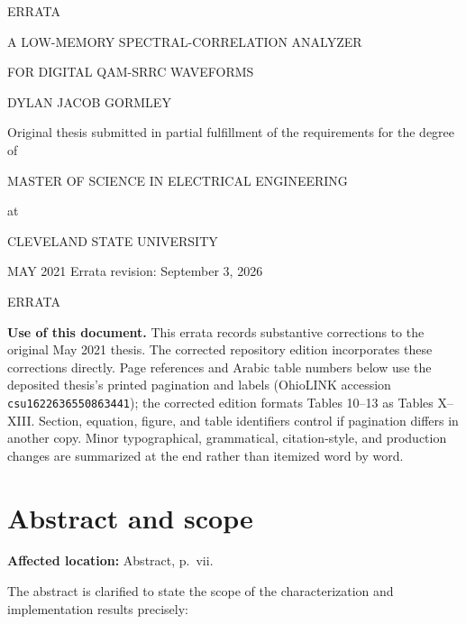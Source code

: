 \documentclass[12pt]{article}
\begin{document}
\hypersetup{pageanchor=false}
\begin{titlepage}
\thispagestyle{empty}
\begin{center}
\vspace*{0.9in}
{\large ERRATA\par}
\vspace{0.55in}
{\large A LOW-MEMORY SPECTRAL-CORRELATION ANALYZER\par}
\vspace{0.08in}
{\large FOR DIGITAL QAM-SRRC WAVEFORMS\par}
\vfill
{\large DYLAN JACOB GORMLEY\par}
\vfill
Original thesis submitted in partial fulfillment of the requirements for the degree of\par
MASTER OF SCIENCE IN ELECTRICAL ENGINEERING\par
at\par
CLEVELAND STATE UNIVERSITY\par
MAY 2021
\vfill
Errata revision: September 3, 2026
\end{center}
\end{titlepage}

\hypersetup{pageanchor=true}

\begin{center}
ERRATA
\end{center}

\noindent\textbf{Use of this document.}
This errata records substantive corrections to the original May 2021 thesis. The corrected repository edition incorporates these corrections directly. Page references and Arabic table numbers below use the deposited thesis's printed pagination and labels (OhioLINK accession \texttt{csu1622636550863441}); the corrected edition formats Tables 10--13 as Tables X--XIII. Section, equation, figure, and table identifiers control if pagination differs in another copy. Minor typographical, grammatical, citation-style, and production changes are summarized at the end rather than itemized word by word.

\section{Abstract and scope}

\noindent\textbf{Affected location:} Abstract, p.~vii.

The abstract is clarified to state the scope of the characterization and implementation results precisely:
\end{document}
